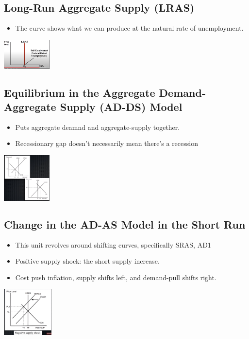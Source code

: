 \documentclass[8pt]{beamer}
\begin{document}
  \begin{frame}
	\section{Long-Run Aggregate Supply (LRAS)}
	\begin{itemize}
		\item The curve shows what we can produce at the natural rate of unemployment.
	\end{itemize}
	\includegraphics[width=2.5cm]{2021-10-12-12-18-10.png}
  \end{frame}
  \begin{frame}
	\section{Equilibrium in the Aggregate Demand-Aggregate Supply (AD-DS) Model}
	\begin{itemize}
		\item Puts aggregate deamnd and aggregate-supply together.
		\item Recessionary gap doesn't necessarily mean there's a recession
	\end{itemize}
	\includegraphics[width=2.5cm]{2021-10-12-12-45-18.png}
  \end{frame}
  \begin{frame}
	\section{Change in the AD-AS Model in the Short Run}
	\begin{itemize}
		\item This unit revolves around shifting curves, specifically SRAS, AD1
		\item Positive supply shock: the short supply increase.
		\item Cost push inflation, supply shifts left, and demand-pull shifts right.
	\end{itemize}
	\includegraphics[height=2.5cm]{2021-10-12-12-47-38.png}
  \end{frame}
\end{document}
